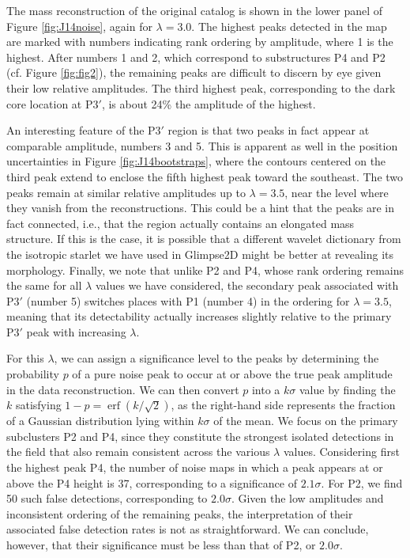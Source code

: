 \documentclass[iop,twocolappendix]{emulateapj}
\DeclareMathOperator*{\erf}{erf}
\begin{document}
The mass reconstruction of the original catalog is shown in the lower panel of Figure \ref{fig:J14noise}, 
again for $\lambda=3.0$. The highest peaks detected in the map are marked with 
numbers indicating rank ordering by amplitude, where 1 is the highest.
After numbers 1 and 2, which correspond to substructures P4 and P2 (cf. Figure \ref{fig:fig2}), the 
remaining peaks are difficult to discern by eye given their low relative amplitudes. 
The third highest peak, corresponding to the dark core location at P3$'$, is about 
24\% the amplitude of the highest.

An interesting feature of the P3$'$ region is that two peaks in fact appear at comparable 
amplitude, numbers 3 and 5. This is apparent as well in the position uncertainties in 
Figure \ref{fig:J14bootstraps}, where the contours centered on the third peak extend to 
enclose the fifth highest peak toward the southeast. The two peaks remain at similar relative 
amplitudes up to $\lambda=3.5$, near the level where they vanish from the reconstructions.
This could be a hint that the peaks are in fact connected, i.e., that the region actually 
contains an elongated mass structure. If this is the case, it is possible that a different 
wavelet dictionary from the isotropic starlet we have used in Glimpse2D might be better at 
revealing its morphology. Finally, we note that unlike P2 and P4, whose rank ordering 
remains the same for all $\lambda$ values we have considered, the secondary peak associated with 
P3$'$ (number 5) switches places with P1 (number 4) in the ordering for $\lambda=3.5$, 
meaning that its detectability actually increases slightly relative to the primary P3$'$ peak 
with increasing $\lambda$.

For this $\lambda$, we can assign a significance level to the peaks by determining the probability $p$ of
a pure noise peak to occur at or above the true peak amplitude in the data reconstruction. We can then
convert $p$ into a $k\sigma$ value by finding the $k$ satisfying $1-p=\erf(k/\sqrt{2})$, as the right-hand side
represents the fraction of a Gaussian distribution lying within $k\sigma$ of the mean. We focus on the 
primary subclusters P2 and P4, since they constitute the strongest isolated detections in the field that also
remain consistent across the various $\lambda$ values.
Considering first the highest peak P4, the number of noise maps in which a peak appears at or above the P4 
height is 37, corresponding to a significance of $2.1\sigma$. For P2, we find 50 such false detections,
corresponding to $2.0\sigma$. Given the low amplitudes and inconsistent ordering of the remaining peaks, 
the interpretation of their associated false detection rates is not as straightforward. 
We can conclude, however, that their significance must be less than that
of P2, or $2.0\sigma$.
\end{document}
